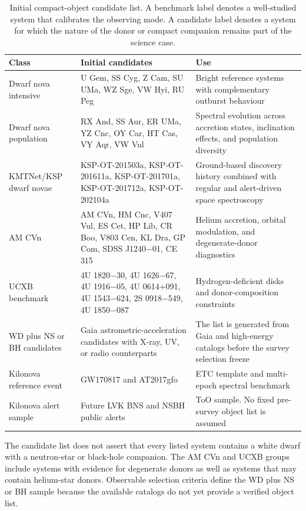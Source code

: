 \documentclass[10pt,onecolumn]{article}
\begin{document}
\begin{table}[H]
\centering
\caption{Initial compact-object candidate list. A benchmark label denotes a
well-studied system that calibrates the observing mode. A candidate label
denotes a system for which the nature of the donor or compact companion
remains part of the science case.}
\label{tab:compact_candidates}
\begin{tabularx}{\textwidth}{@{}P{34mm} P{72mm} Y@{}}
\toprule
\textbf{Class} & \textbf{Initial candidates} & \textbf{Use}\\
\midrule
Dwarf nova intensive & U Gem, SS Cyg, Z Cam, SU UMa, WZ Sge, VW Hyi, RU Peg &
Bright reference systems with complementary outburst behaviour\\
Dwarf nova population & RX And, SS Aur, ER UMa, YZ Cnc, OY Car, HT Cas,
VY Aqr, VW Vul & Spectral evolution across accretion states, inclination
effects, and population diversity\\
KMTNet/KSP dwarf novae & KSP-OT-201503a, KSP-OT-201611a, KSP-OT-201701a,
KSP-OT-201712a, KSP-OT-202104a & Ground-based discovery history combined
with regular and alert-driven space spectroscopy\\
AM CVn & AM CVn, HM Cnc, V407 Vul, ES Cet, HP Lib, CR Boo, V803 Cen, KL Dra,
GP Com, SDSS J1240$-$01, CE 315 & Helium accretion, orbital modulation, and
degenerate-donor diagnostics\\
UCXB benchmark & 4U 1820$-$30, 4U 1626$-$67, 4U 1916$-$05, 4U 0614+091,
4U 1543$-$624, 2S 0918$-$549, 4U 1850$-$087 & Hydrogen-deficient disks and
donor-composition constraints\\
WD plus NS or BH candidates & Gaia astrometric-acceleration candidates with
X-ray, UV, or radio counterparts & The list is generated from Gaia and
high-energy catalogs before the survey selection freeze\\
Kilonova reference event & GW170817 and AT2017gfo & ETC template and
multi-epoch spectral benchmark\\
Kilonova alert sample & Future LVK BNS and NSBH public alerts & ToO sample.
No fixed pre-survey object list is assumed\\
\bottomrule
\end{tabularx}
\end{table}

The candidate list does not assert that every listed system contains a white
dwarf with a neutron-star or black-hole companion. The AM CVn and UCXB groups
include systems with evidence for degenerate donors as well as systems that
may contain helium-star donors. Observable selection criteria define the WD
plus NS or BH sample because the available catalogs do not yet provide a
verified object list.
\end{document}
